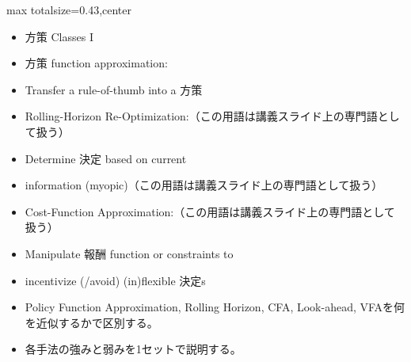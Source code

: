 \clearpage
{}
\begin{minipage}[t]{0.405\textwidth}
\begin{adjustbox}{max totalsize={\textwidth}{0.43\textheight},center}
\begin{minipage}{\textwidth}\scriptsize
{}\begin{itemize}
\item 方策 Classes I
\item 方策 function approximation:
\item Transfer a rule-of-thumb into a 方策
\item Rolling-Horizon Re-Optimization:（この用語は講義スライド上の専門語として扱う）
\item Determine 決定 based on current
\item information (myopic)（この用語は講義スライド上の専門語として扱う）
\item Cost-Function Approximation:（この用語は講義スライド上の専門語として扱う）
\item Manipulate 報酬 function or constraints to
\item incentivize (/avoid) (in)flexible 決定s
\end{itemize}\begin{itemize}
\item Policy Function Approximation, Rolling Horizon, CFA, Look-ahead, VFAを何を近似するかで区別する。
\item 各手法の強みと弱みを1セットで説明する。
\end{itemize}
\end{minipage}
\end{adjustbox}
\end{minipage}\hfill
